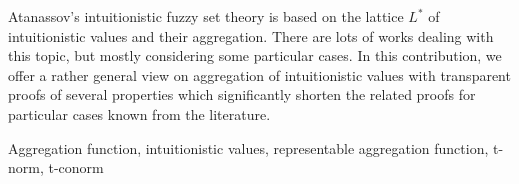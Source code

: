  Atanassov's intuitionistic fuzzy set theory is based on the lattice $L^*$ of intuitionistic values and their aggregation. There are lots of
works dealing with this topic, but mostly considering some particular cases. In this contribution, we offer  a rather general view on aggregation of intuitionistic values with transparent proofs of several properties which significantly shorten the related proofs for particular cases known from the literature.


\noindent
\smallskip
{} Aggregation function, intuitionistic values, representable aggregation function, t-norm, t-conorm

